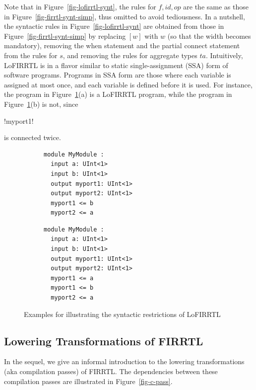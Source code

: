 %
Note that in Figure~\ref{fig-lofirrtl-synt}, the rules for $f, id, op$ are the same as those in Figure~\ref{fig-firrtl-synt-simp}, thus omitted to avoid tediousness. In a nutshell, the syntactic rules in Figure~\ref{fig-lofirrtl-synt} are obtained from those in Figure~\ref{fig-firrtl-synt-simp} by replacing $[w]$ with $w$ (so that the width becomes mandatory), removing the when statement and the partial connect statement from the rules for $s$, and removing the rules for aggregate types $ta$.
%
Intuitively, LoFIRRTL is in a flavor similar to static single-assignment (SSA) form of software programs. Programs in SSA form are those where each variable is assigned at most once, and each variable is defined before it is used.  For instance, the program in Figure~\ref{fig-lofirrtl-exmp}(a) is a LoFIRRTL program, while the program in Figure~\ref{fig-lofirrtl-exmp}(b) is not, since \begin{lstinline}!myport1!\end{lstinline} is connected twice.
\begin{figure}[htbp]
\centering
\begin{subfigure}[b]{0.4\textwidth}
         \centering 
\begin{lstlisting}[basicstyle=\scriptsize\ttfamily]
module MyModule :
  input a: UInt<1>
  input b: UInt<1>
  output myport1: UInt<1>
  output myport2: UInt<1>
  myport1 <= b
  myport2 <= a
\end{lstlisting}
\caption{}
\end{subfigure}
\hspace{4mm}
\begin{subfigure}[b]{0.4\textwidth}
         \centering 
\begin{lstlisting}[basicstyle=\scriptsize\ttfamily]
module MyModule :
  input a: UInt<1>
  input b: UInt<1>
  output myport1: UInt<1>
  output myport2: UInt<1>
  myport1 <= a
  myport1 <= b
  myport2 <= a
\end{lstlisting}
\caption{}
\end{subfigure}
\caption{Examples for illustrating the syntactic restrictions of LoFIRRTL}
\label{fig-lofirrtl-exmp}
\end{figure}

\subsection{Lowering Transformations of FIRRTL}

In the sequel, we give an informal introduction to the lowering transformations (aka compilation passes) of  FIRRTL. The dependencies between these compilation passes are illustrated in Figure~\ref{fig-c-pass}.

